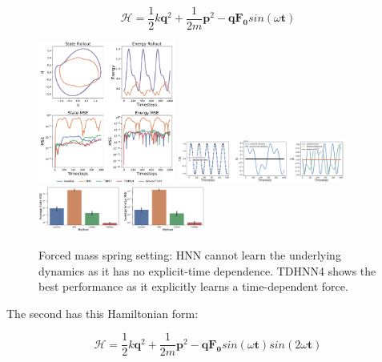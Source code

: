 \documentclass[twoside]{article}
\begin{document}
\begin{equation}
\mathcal{H} = \frac{1}{2}k\mathbf{q}^2 + \frac{1}{2m}\mathbf{p}^2 - \mathbf{q}\mathbf{F_0}sin(\omega \mathbf{t}) 
\end{equation}

\begin{figure}[h!]
\centering
\includegraphics[width=0.4\textwidth]{figures/forced_mass_spring_1.pdf}
\includegraphics[width=0.49\textwidth]{figures/dpdt_forced_mass_spring_1.pdf}
\includegraphics[width=0.49\textwidth]{figures/mass_spring_forced_1_errors.pdf}
\caption{Forced mass spring setting: HNN cannot learn the underlying dynamics as it has no explicit-time dependence. TDHNN4 shows the best performance as it explicitly learns a time-dependent force.}
\end{figure}

The second has this Hamiltonian form:

\begin{equation}
\mathcal{H} = \frac{1}{2}k\mathbf{q}^2 + \frac{1}{2m}\mathbf{p}^2 - \mathbf{q}\mathbf{F_0}sin(\omega \mathbf{t})sin(2\omega \mathbf{t})
\end{equation}
\end{document}
